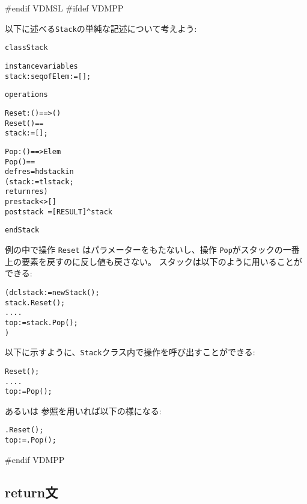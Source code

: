 \documentclass[\pformat,12pt]{jarticle}
\begin{document}
\begin{description}
#endif VDMSL
#ifdef VDMPP

  以下に述べる{\tt Stack}の単純な記述について考えよう:

  \begin{alltt}
  class Stack

  instance variables
    stack: seq of Elem := [];

  operations

    \PUBLIC Reset: () ==> ()
    Reset() ==
      stack := []; 

    \PUBLIC Pop: () ==> Elem
    Pop() ==
      def res = hd stack in
       (stack := tl stack;
        return res)
    pre stack <> []
    post stack~ = [RESULT] ^ stack

  end Stack
  \end{alltt}

例の中で操作 {\tt Reset} はパラメーターをもたないし、操作 {\tt Pop}がスタックの一番上の要素を戻すのに反し値も戻さない。 
スタックは以下のように用いることができる:
  \begin{alltt}
    ( dcl stack := new Stack();
      stack.Reset();
      ....
      top := stack.Pop();
    )
  \end{alltt}
 
 以下に示すように、{\tt Stack}クラス内で操作を呼び出すことができる:   
  \begin{alltt}
    Reset();
    ....
    top := Pop();
  \end{alltt}
  
 あるいは  参照を用いれば以下の様になる:
  \begin{alltt}
    .Reset();
    top := .Pop();
  \end{alltt}

#endif VDMPP
\end{description}

\subsection{return文}
\end{document}
